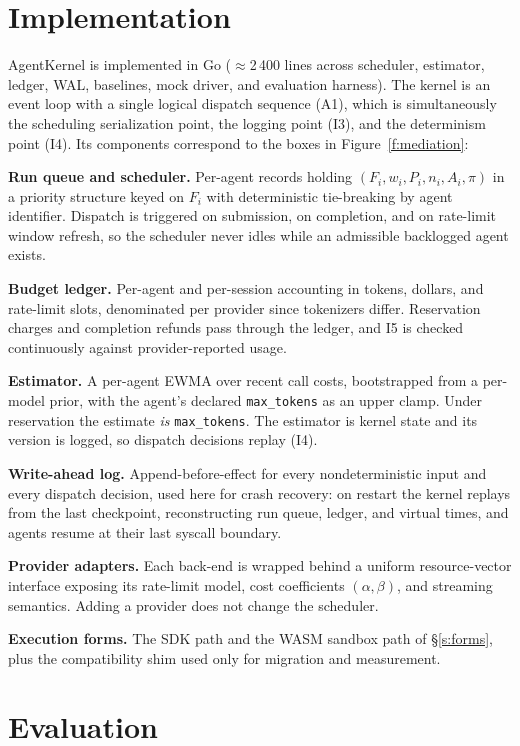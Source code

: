 \documentclass[letterpaper,11pt,leqno]{article}
\begin{document}
\section{Implementation}\label{s:implementation}

AgentKernel is implemented in Go ($\approx$2\,400 lines across scheduler, estimator, ledger, WAL, baselines, mock driver, and evaluation harness). The kernel is an event loop with a single logical dispatch sequence (A1), which is simultaneously the scheduling serialization point, the logging point (I3), and the determinism point (I4). Its components correspond to the boxes in Figure~\ref{f:mediation}:

\textbf{Run queue and scheduler.} Per-agent records holding $(F_i, w_i, P_i, n_i, A_i, \pi)$ in a priority structure keyed on $F_i$ with deterministic tie-breaking by agent identifier. Dispatch is triggered on submission, on completion, and on rate-limit window refresh, so the scheduler never idles while an admissible backlogged agent exists.

\textbf{Budget ledger.} Per-agent and per-session accounting in tokens, dollars, and rate-limit slots, denominated per provider since tokenizers differ. Reservation charges and completion refunds pass through the ledger, and I5 is checked continuously against provider-reported usage.

\textbf{Estimator.} A per-agent EWMA over recent call costs, bootstrapped from a per-model prior, with the agent's declared \texttt{max\_tokens} as an upper clamp. Under reservation the estimate \emph{is} \texttt{max\_tokens}. The estimator is kernel state and its version is logged, so dispatch decisions replay (I4).

\textbf{Write-ahead log.} Append-before-effect for every nondeterministic input and every dispatch decision, used here for crash recovery: on restart the kernel replays from the last checkpoint, reconstructing run queue, ledger, and virtual times, and agents resume at their last syscall boundary.

\textbf{Provider adapters.} Each back-end is wrapped behind a uniform resource-vector interface exposing its rate-limit model, cost coefficients $(\alpha, \beta)$, and streaming semantics. Adding a provider does not change the scheduler.

\textbf{Execution forms.} The SDK path and the WASM sandbox path of \S\ref{s:forms}, plus the compatibility shim used only for migration and measurement.

\section{Evaluation}\label{s:evaluation}
\end{document}
